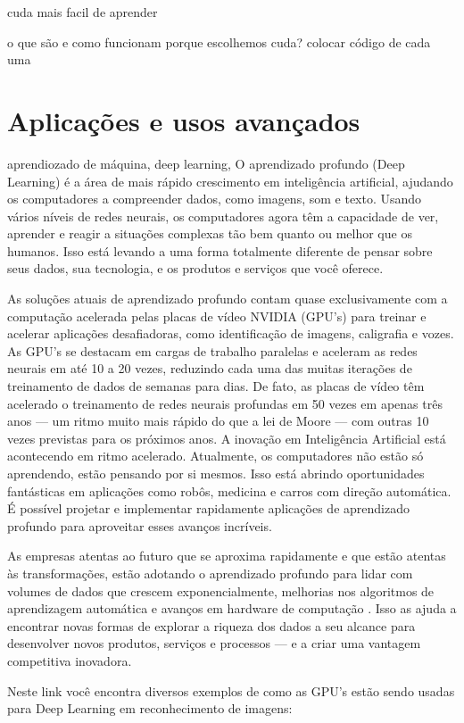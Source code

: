 cuda mais facil de aprender


  o que são e como funcionam
  porque escolhemos cuda?
  colocar código de cada uma

\section{Aplicações e usos avançados}

aprendiozado de máquina, deep learning,
O aprendizado profundo (Deep Learning) é a área de mais rápido crescimento em inteligência artificial, ajudando os computadores a compreender dados, como imagens, som e texto. Usando vários níveis de redes neurais, os computadores agora têm a capacidade de ver, aprender e reagir a situações complexas tão bem quanto ou melhor que os humanos. Isso está levando a uma forma totalmente diferente de pensar sobre seus dados, sua tecnologia, e os produtos e serviços que você oferece.

As soluções atuais de aprendizado profundo contam quase exclusivamente com a computação acelerada pelas placas de vídeo NVIDIA (GPU’s) para treinar e acelerar aplicações desafiadoras, como identificação de imagens, caligrafia e vozes. As GPU’s se destacam em cargas de trabalho paralelas e aceleram as redes neurais em até 10 a 20 vezes, reduzindo cada uma das muitas iterações de treinamento de dados de semanas para dias. De fato, as placas de vídeo têm acelerado o treinamento de redes neurais profundas em 50 vezes em apenas três anos — um ritmo muito mais rápido do que a lei de Moore — com outras 10 vezes previstas para os próximos anos. A inovação em Inteligência Artificial está acontecendo em ritmo acelerado. Atualmente, os computadores não estão só aprendendo, estão pensando por si mesmos. Isso está abrindo oportunidades fantásticas em aplicações como robôs, medicina e carros com direção automática. É possível projetar e implementar rapidamente aplicações de aprendizado profundo para aproveitar esses avanços incríveis.

As empresas atentas ao futuro que se aproxima rapidamente e que estão atentas às transformações, estão adotando o aprendizado profundo para lidar com volumes de dados que crescem exponencialmente, melhorias nos algoritmos de aprendizagem automática e avanços em hardware de computação . Isso as ajuda a encontrar novas formas de explorar a riqueza dos dados a seu alcance para desenvolver novos produtos, serviços e processos — e a criar uma vantagem competitiva inovadora.

Neste link você encontra diversos exemplos de como as GPU’s estão sendo usadas para Deep Learning em reconhecimento de imagens:

